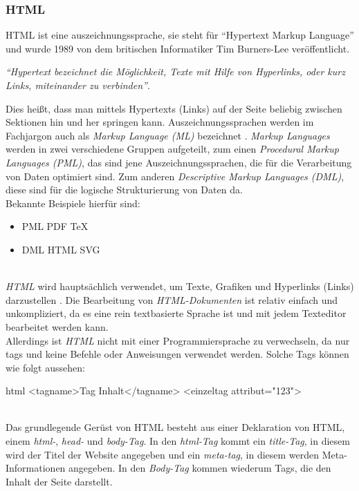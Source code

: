 		\subsubsection{HTML}
		\label{chapter:study-frontend-html}
		HTML ist eine \Gls{auszeichnungssprache}, sie steht für \enquote{Hypertext Markup Language} und wurde 1989 von dem britischen Informatiker Tim Burners-Lee veröffentlicht.\\ 
		\begin{center}
			\textit{\enquote{Hypertext bezeichnet die Möglichkeit, Texte mit Hilfe von Hyperlinks, oder kurz Links, miteinander zu verbinden}}\cite{html5-css3-def}.
		\end{center}
		Dies heißt, dass man mittels Hypertexts (Links) auf der Seite beliebig zwischen Sektionen hin und her springen kann.
		Auszeichnungssprachen werden im Fachjargon auch als \textit{Markup Language (ML)} bezeichnet \cite{auszeichnungssprachen}. \textit{Markup Languages} werden in zwei verschiedene Gruppen aufgeteilt, zum einen \textit{Procedural Markup Languages (PML)}, das sind jene Auszeichnungssprachen, die für die Verarbeitung von Daten optimiert sind. Zum anderen \textit{Descriptive Markup Languages (DML)}, diese sind für die logische Strukturierung von Daten da.\\Bekannte Beispiele hierfür sind:
		\begin{itemize}
		\item PML
		\subitem PDF
		\subitem TeX
		\item DML
		\subitem HTML
		\subitem SVG
		\end{itemize}
	\label{list:dmlbsp}~\\
		\textit{HTML} wird hauptsächlich verwendet, um Texte, Grafiken und Hyperlinks (Links) darzustellen \cite{html5-css3-handbuch, html5-css3-def}. Die Bearbeitung von \textit{HTML-Dokumenten} ist relativ einfach und unkompliziert, da es eine rein textbasierte Sprache ist und mit jedem Texteditor bearbeitet werden kann.\\
		Allerdings ist \textit{HTML} nicht mit einer Programmiersprache zu verwechseln, da nur \Gls{tag}s und keine Befehle oder Anweisungen verwendet werden. Solche Tags können wie folgt aussehen:
		\begin{code}{html}
			<tagname>Tag Inhalt</tagname>
			<einzeltag attribut="123">
		\end{code}
	\label{list:htmltags} ~\\
		Das grundlegende Gerüst von HTML besteht aus einer Deklaration von HTML, einem \textit{html-}, \textit{head-} und \textit{body-Tag}. In den \textit{html-Tag} kommt ein \textit{title-Tag}, in diesem wird der Titel der Website angegeben und ein \textit{meta-tag}, in diesem werden Meta-Informationen angegeben. In den \textit{Body-Tag} kommen wiederum Tags, die den Inhalt der Seite darstellt. 
